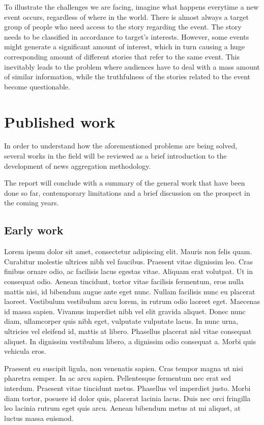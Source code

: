 \documentclass[english]{tktltiki}
\begin{document}
To illustrate the challenges we are facing, imagine what happens everytime a new event occurs, regardless of where in the world. There is almost always a target group of people who need access to the story regarding the event. The story needs to be classified in accordance to target's interests. However, some events might generate a significant amount of interest, which in turn causing a huge corresponding amount of different stories that refer to the same event. This inevitably leads to the problem where audiences have to deal with a mass amount of similar information, while the truthfulness of the stories related to the event become questionable.

\pagebreak

\section{Published work}

In order to understand how the aforementioned problems are being solved, several works in the field will be reviewed as a brief introduction to the development of news aggregation methodology.

The report will conclude with a summary of the general work that have been done so far, contemporary limitations and a brief discussion on the prospect in the coming years.

\subsection{Early work}


Lorem ipsum dolor sit amet, consectetur adipiscing elit. Mauris non felis quam. Curabitur molestie ultrices nibh vel faucibus. Praesent vitae dignissim leo. Cras finibus ornare odio, ac facilisis lacus egestas vitae. Aliquam erat volutpat. Ut in consequat odio. Aenean tincidunt, tortor vitae facilisis fermentum, eros nulla mattis nisi, id bibendum augue ante eget nunc. Nullam facilisis nunc eu placerat laoreet. Vestibulum vestibulum arcu lorem, in rutrum odio laoreet eget. Maecenas id massa sapien. Vivamus imperdiet nibh vel elit gravida aliquet. Donec nunc diam, ullamcorper quis nibh eget, vulputate vulputate lacus. In nunc urna, ultricies vel eleifend id, mattis at libero. Phasellus placerat nisl vitae consequat aliquet. In dignissim vestibulum libero, a dignissim odio consequat a. Morbi quis vehicula eros.\cite{Yangarber2017GroupingBN, INT:INT1022}

Praesent eu suscipit ligula, non venenatis sapien. Cras tempor magna ut nisi pharetra semper. In ac arcu sapien. Pellentesque fermentum nec erat sed interdum. Praesent vitae tincidunt metus. Phasellus vel imperdiet justo. Morbi diam tortor, posuere id dolor quis, placerat lacinia lacus. Duis nec orci fringilla leo lacinia rutrum eget quis arcu. Aenean bibendum metus at mi aliquet, at luctus massa euismod.
\end{document}
